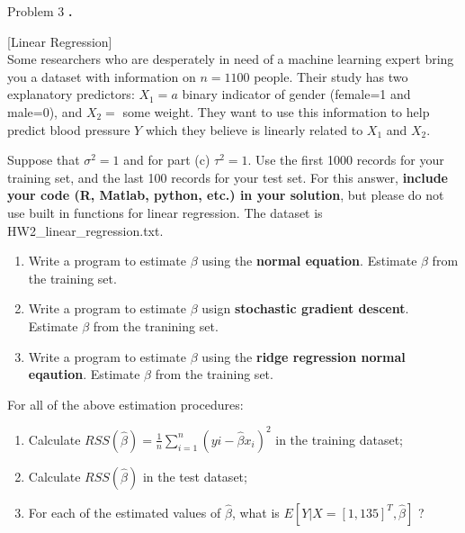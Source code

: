 \documentclass{article}
\newcounter{pcounter}                                   %
\newenvironment{problem}                                %
{                                                       %
    \color{gray}                                        %
    \stepcounter{pcounter}                              %
    \textbf{\arabic{pcounter}.}                         %
}{}                                                     %
\begin{document}
    \begin{section}{Problem 3}
        \setcounter{pcounter}{0}
        \begin{problem}
            [Linear Regression]\\
            Some researchers who are desperately in need of a machine learning expert bring you a dataset with information on $n = 1100$ people.
            Their study has two explanatory predictors: $X_1=a$ binary indicator of gender (female=1 and male=0), and $X_2=$ some weight.
            They want to use this information to help predict blood pressure $Y$ which they believe is linearly related to $X_1$ and $X_2$.
            
            Suppose that $\sigma^2 = 1$ and for part (c) $\tau^2=1$. Use the first 1000 records for your training set, and the last 100 records for your test set.
            For this answer, \textbf{include your code (R, Matlab, python, etc.) in your solution}, but please do not use built in functions for linear regression. The dataset is HW2\_linear\_regression.txt.
            \begin{enumerate}[label=(\alph*)]
                \item Write a program to estimate $\beta$ using the \textbf{normal equation}. Estimate $\beta$ from the training set.
                \item Write a program to estimate $\beta$ usign \textbf{stochastic gradient descent}. Estimate $\beta$ from the tranining set.
                \item Write a program to estimate $\beta$ using the \textbf{ridge regression normal eqaution}. Estimate $\beta$ from the training set.
            \end{enumerate}
            For all of the above estimation procedures:
            \begin{enumerate}[resume, label=(\alph*)]
                \item Calculate $RSS(\hat{\beta}) = \frac{1}{n} \sum_{i=1}^{n} (yi - \hat{\beta} x_i)^2$ in the training dataset;
                \item Calculate $RSS(\hat{\beta})$ in the test dataset;
                \item For each of the estimated values of $\hat{\beta}$, what is $E[Y|X=[1,135]^T, \hat{\beta}]$ ?
            \end{enumerate}
        \end{problem}


\end{section}
\end{document}
